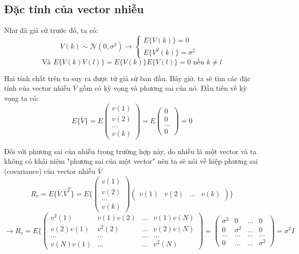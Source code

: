 \documentclass{article}
\begin{document}
\subsection{Đặc tính của vector nhiễu}
Như đã giả sử trước đó, ta có:
$$V(k) \sim \mathcal{N}(0,\sigma^2) \rightarrow \begin{cases}
    E \{ V(k) \} = 0 &\\
    E \{ V^2(k) \} = \sigma^2&
\end{cases}$$
$$ \text{Và } E \{ V(k)V(l) \} = E \{ V(k) \}E \{ V(l) \} = 0 \text{ nếu } k\neq l  $$

Hai tính chất trên ta suy ra được từ giả sử ban đầu. Bây giờ, ta sẽ tìm các đặc tính của vector nhiễu $\overline{V}$ gồm có kỳ vọng và phương sai của nó. Đầu tiên về kỳ vọng ta có:
$$ E\{ \overline{V} \} = E\begin{pmatrix}
    v(1)\\v(2)\\...\\v(k)
\end{pmatrix} = E\begin{pmatrix}
    0\\0\\...\\0
\end{pmatrix} = 0$$

Đối với phương sai của nhiễu trong trường hợp này, do nhiễu là một vector và ta không có khái niệm "phương sai của một vector" nên ta sẽ nói về hiệp phương sai (covariance) của vector nhiễu $\overline{V}$
$$R_v = E \{ \overline{V} .\overline{V}^T \} = E \{\begin{pmatrix}
    v(1)\\v(2)\\...\\v(k)
\end{pmatrix} \begin{pmatrix}
    v(1)&v(2)&...&v(k)
\end{pmatrix}\}$$
$$\rightarrow R_v = E \{\begin{pmatrix}
    v^2(1)&v(1)v(2)&...&v(1)v(N)\\
    v(2)v(1)&v^2(2)&...&v(2)v(N)\\
    ...&...&...&...\\
    v(N)v(1)&...&...&v^2(N)
\end{pmatrix} = \begin{pmatrix}
    \sigma^2&0&...&0\\
     0&\sigma^2&...&0\\
    ...&...&...&...\\
    0&...&...&\sigma^2
\end{pmatrix} = \sigma^2 I$$
\end{document}
